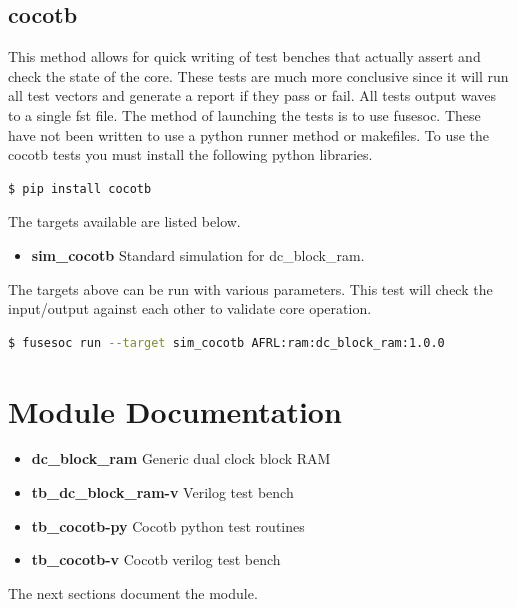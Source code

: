 \subsection{cocotb}
\par
This method allows for quick writing of test benches that actually assert and check the state of the core.
These tests are much more conclusive since it will run all test vectors and generate a report if they
pass or fail. All tests output waves to a single fst file. The method of launching the tests is to use
fusesoc. These have not been written to use a python runner method or makefiles.
To use the cocotb tests you must install the following python libraries.
\begin{lstlisting}[language=bash]
  $ pip install cocotb
\end{lstlisting}

The targets available are listed below.
\begin{itemize}
  \item \textbf{sim\_cocotb} Standard simulation for dc_block_ram.
\end{itemize}

The targets above can be run with various parameters.
This test will check the input/output against each other to validate core operation.
\begin{lstlisting}[language=bash]
  $ fusesoc run --target sim_cocotb AFRL:ram:dc_block_ram:1.0.0
\end{lstlisting}

\newpage

\section{Module Documentation} \label{Module Documentation}

\begin{itemize}
\item \textbf{dc\_block\_ram} Generic dual clock block RAM\\
\item \textbf{tb\_dc\_block\_ram-v} Verilog test bench\\
\item \textbf{tb\_cocotb-py} Cocotb python test routines\\
\item \textbf{tb\_cocotb-v} Cocotb verilog test bench\\
\end{itemize}
The next sections document the module.

